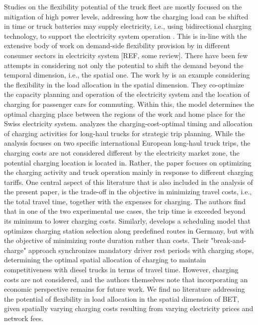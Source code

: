 \documentclass[preprint,10pt,review, authoryear]{elsarticle}
\begin{document}
    Studies on the flexibility potential of the truck fleet are mostly focused on the mitigation of high power levels, addressing how the charging load can be shifted in time or truck batteries may supply electricity, i.e., using bidirectional charging technology, to support the electricity system operation \citep{wevj15020056, GOLAB2025134385}. This is in-line with the extensive body of work on demand-side flexibility provision by in different consumer sectors in electricity system [REF, some review]. There have been few attempts in considering not only the potential to shift the demand beyond the temporal dimension, i.e., the spatial one. The work by \citet{WANG2025135452} is an example considering the flexibility in the load allocation in the spatial dimension. They co-optimize the capacity planning and operation of the electricity system and the location of charging for passenger cars for commuting. Within this, the model determines the optimal charging place between the regions of the work and home place for the Swiss electricity system. \citet{WAN2024132361} analyzes the charging-cost-optimal timing and allocation of charging activities for long-haul trucks for strategic trip planning. While the analysis focuses on two specific international European long-haul truck trips, the charging costs are not considered different by the electricity market zone, the potential charging location is located in. Rather, the paper focuses on optimizing the charging activity and truck operation mainly in response to different charging tariffs. One central aspect of this literature that is also included in the analysis of the present paper, is the trade-off in the objective in minimizing travel costs, i.e., the total travel time, together with the expenses for charging. The authors find that in one of the two experimental use cases, the trip time is exceeded beyond its minimum to lower charging costs. Similarly, \citet{BROCKMANN2025100047} develops a scheduling model that optimizes charging station selection along predefined routes in Germany, but with the objective of minimizing route duration rather than costs. Their "break-and-charge" approach synchronizes mandatory driver rest periods with charging stops, determining the optimal spatial allocation of charging to maintain competitiveness with diesel trucks in terms of travel time. However, charging costs are not considered, and the authors themselves note that incorporating an economic perspective remains for future work.
    We find no literature addressing the potential of flexibility in load allocation in the spatial dimension of BET, given spatially varying charging costs resulting from varying electricity prices and network fees. 
\end{document}
